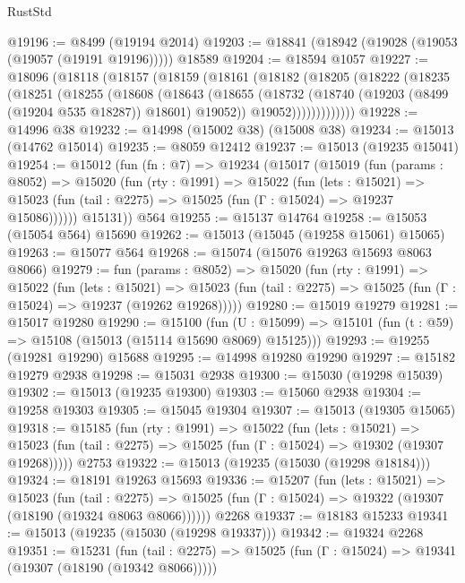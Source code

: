 \begin{lexlean}{RustStd}
\begin{coremodule}
@19196 := @8499 (@19194 @2014)
@19203 := @18841 (@18942 (@19028 (@19053 (@19057 (@19191 @19196))))) @18589
@19204 := @18594 @1057
@19227 := @18096
    (@18118
      (@18157
        (@18159
          (@18161
            (@18182
              (@18205
                (@18222
                  (@18235
                    (@18251
                      (@18255
                        (@18608
                          (@18643
                            (@18655
                              (@18732 (@18740 (@19203 (@8499 (@19204 @535 @18287)) @18601) @19052))
                              @19052)))))))))))))
@19228 := @14996 @38
@19232 := @14998 (@15002 @38) (@15008 @38)
@19234 := @15013 (@14762 @15014)
@19235 := @8059 @12412
@19237 := @15013 (@19235 @15041)
@19254 := @15012
    (fun (fn : @7) =>
    @19234
      (@15017
        (@15019
          (fun (params : @8052) =>
          @15020
            (fun (rty : @1991) =>
            @15022
              (fun (lets : @15021) =>
              @15023 (fun (tail : @2275) => @15025 (fun (Γ : @15024) => @19237 @15086))))))
        @15131))
    @564
@19255 := @15137 @14764
@19258 := @15053 (@15054 @564) @15690
@19262 := @15013 (@15045 (@19258 @15061) @15065)
@19263 := @15077 @564
@19268 := @15074 (@15076 @19263 @15693 @8063 @8066)
@19279 := fun (params : @8052) =>
  @15020
    (fun (rty : @1991) =>
    @15022
      (fun (lets : @15021) =>
      @15023 (fun (tail : @2275) => @15025 (fun (Γ : @15024) => @19237 (@19262 @19268)))))
@19280 := @15019 @19279
@19281 := @15017 @19280
@19290 := @15100
    (fun (U : @15099) => @15101 (fun (t : @59) => @15108 (@15013 (@15114 @15690 @8069) @15125)))
@19293 := @19255 (@19281 @19290) @15688
@19295 := @14998 @19280 @19290
@19297 := @15182 @19279 @2938
@19298 := @15031 @2938
@19300 := @15030 (@19298 @15039)
@19302 := @15013 (@19235 @19300)
@19303 := @15060 @2938
@19304 := @19258 @19303
@19305 := @15045 @19304
@19307 := @15013 (@19305 @15065)
@19318 := @15185
    (fun (rty : @1991) =>
    @15022
      (fun (lets : @15021) =>
      @15023 (fun (tail : @2275) => @15025 (fun (Γ : @15024) => @19302 (@19307 @19268)))))
    @2753
@19322 := @15013 (@19235 (@15030 (@19298 @18184)))
@19324 := @18191 @19263 @15693
@19336 := @15207
    (fun (lets : @15021) =>
    @15023
      (fun (tail : @2275) =>
      @15025 (fun (Γ : @15024) => @19322 (@19307 (@18190 (@19324 @8063 @8066))))))
    @2268
@19337 := @18183 @15233
@19341 := @15013 (@19235 (@15030 (@19298 @19337)))
@19342 := @19324 @2268
@19351 := @15231
    (fun (tail : @2275) => @15025 (fun (Γ : @15024) => @19341 (@19307 (@18190 (@19342 @8066)))))

\end{coremodule}
\end{lexlean}
